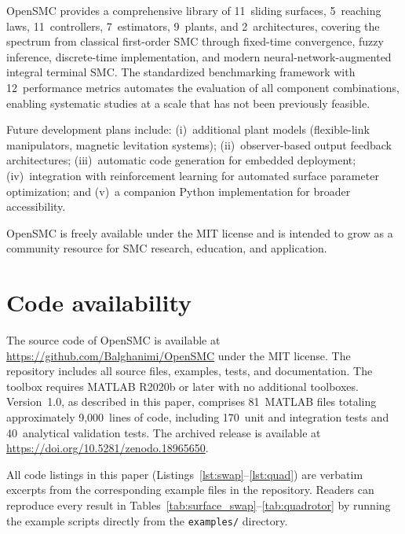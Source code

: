 \documentclass[preprint,12pt]{elsarticle}
\begin{document}
OpenSMC provides a comprehensive library of 11~sliding surfaces, 5~reaching laws, 11~controllers, 7~estimators, 9~plants, and 2~architectures, covering the spectrum from classical first-order SMC through fixed-time convergence, fuzzy inference, discrete-time implementation, and modern neural-network-augmented integral terminal SMC. The standardized benchmarking framework with 12~performance metrics automates the evaluation of all component combinations, enabling systematic studies at a scale that has not been previously feasible.

Future development plans include: (i)~additional plant models (flexible-link manipulators, magnetic levitation systems); (ii)~observer-based output feedback architectures; (iii)~automatic code generation for embedded deployment; (iv)~integration with reinforcement learning for automated surface parameter optimization; and (v)~a companion Python implementation for broader accessibility.

OpenSMC is freely available under the MIT license and is intended to grow as a community resource for SMC research, education, and application.


\section*{Code availability}

The source code of OpenSMC is available at \url{https://github.com/Balghanimi/OpenSMC} under the MIT license. The repository includes all source files, examples, tests, and documentation. The toolbox requires MATLAB R2020b or later with no additional toolboxes. Version~1.0, as described in this paper, comprises 81~MATLAB files totaling approximately 9,000~lines of code, including 170~unit and integration tests and 40~analytical validation tests. The archived release is available at \url{https://doi.org/10.5281/zenodo.18965650}.

All code listings in this paper (Listings~\ref{lst:swap}--\ref{lst:quad}) are verbatim excerpts from the corresponding example files in the repository. Readers can reproduce every result in Tables~\ref{tab:surface_swap}--\ref{tab:quadrotor} by running the example scripts directly from the \texttt{examples/} directory.


\end{document}
